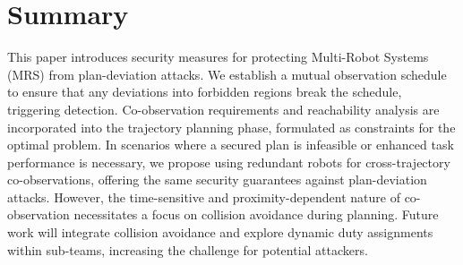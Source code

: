 \documentclass[10pt,twocolumn,twoside]{IEEEtran}
\begin{document}
\section{Summary}\label{sec:summary}

This paper introduces security measures for protecting Multi-Robot Systems (MRS) from plan-deviation attacks. We establish a mutual observation schedule to ensure that any deviations into forbidden regions break the schedule, triggering detection. Co-observation requirements and reachability analysis are incorporated into the trajectory planning phase, formulated as constraints for the optimal problem. In scenarios where a secured plan is infeasible or enhanced task performance is necessary, we propose using redundant robots for cross-trajectory co-observations, offering the same security guarantees against plan-deviation attacks. However, the time-sensitive and proximity-dependent nature of co-observation necessitates a focus on collision avoidance during planning. Future work will integrate collision avoidance and explore dynamic duty assignments within sub-teams, increasing the challenge for potential attackers.


\end{document}
